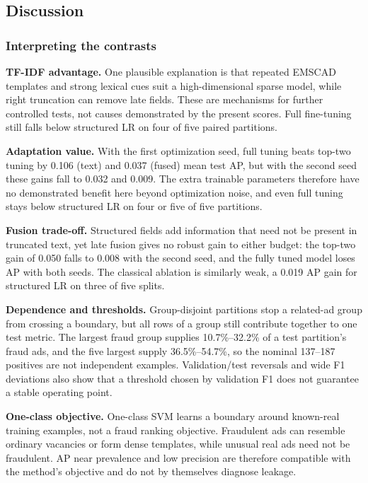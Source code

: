 \subsection{Discussion}
\label{discussion}

\subsubsection{Interpreting the contrasts}

\textbf{TF-IDF advantage.} One plausible explanation is that repeated EMSCAD templates and strong
lexical cues suit a high-dimensional sparse model, while right truncation can remove late fields.
These are mechanisms for further controlled tests, not causes demonstrated by the present scores.
Full fine-tuning still falls below structured LR on four of five paired partitions.

\textbf{Adaptation value.} With the first optimization seed, full tuning beats top-two tuning by 0.106
(text) and 0.037 (fused) mean test AP, but with the second seed these gains fall to 0.032 and 0.009.
The extra trainable parameters therefore have no demonstrated benefit here beyond optimization noise,
and even full tuning stays below structured LR on four or five of five partitions.

\textbf{Fusion trade-off.} Structured fields add information that need not be present in truncated
text, yet late fusion gives no robust gain to either budget: the top-two gain of 0.050 falls to 0.008
with the second seed, and the fully tuned model loses AP with both seeds. The classical ablation is
similarly weak, a 0.019 AP gain for structured LR on three of five splits.

\textbf{Dependence and thresholds.} Group-disjoint partitions stop a related-ad group from crossing a
boundary, but all rows of a group still contribute together to one test metric. The largest fraud
group supplies 10.7\%--32.2\% of a test partition's fraud ads, and the five largest supply
36.5\%--54.7\%, so the nominal 137--187 positives are not independent examples. Validation/test
reversals and wide F1 deviations also show that a threshold chosen by validation F1 does not
guarantee a stable operating point.

\textbf{One-class objective.} One-class SVM learns a boundary around known-real training examples,
not a fraud ranking objective. Fraudulent ads can resemble ordinary vacancies or form dense
templates, while unusual real ads need not be fraudulent. AP near prevalence and low precision are
therefore compatible with the method's objective and do not by themselves diagnose leakage.

